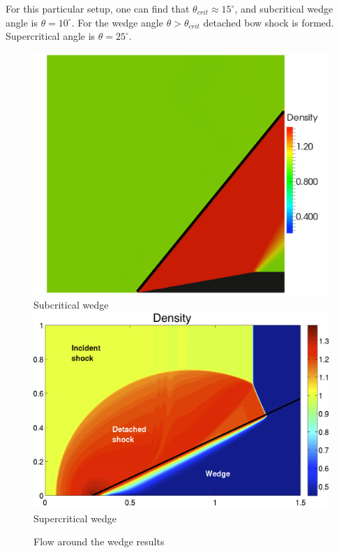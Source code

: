 For this particular setup, one can find that $\theta_{crit} \approx 15^\circ$, and subcritical wedge angle is $\theta = 10^\circ$. For the wedge angle $\theta > \theta_{crit}$ detached bow shock is formed. Supercritical angle is $\theta = 25^\circ$.
\begin{figure}[h!]
\centering \includegraphics[width=0.69\linewidth]{fig/wedge_sub.png}\\
Subcritical wedge\\ [1ex]
\includegraphics[width=0.65\linewidth]{fig/wedge_super.png}\\
Supercritical wedge\\
\caption{Flow around the wedge results \label{fig:wedge_res}}
\end{figure}

